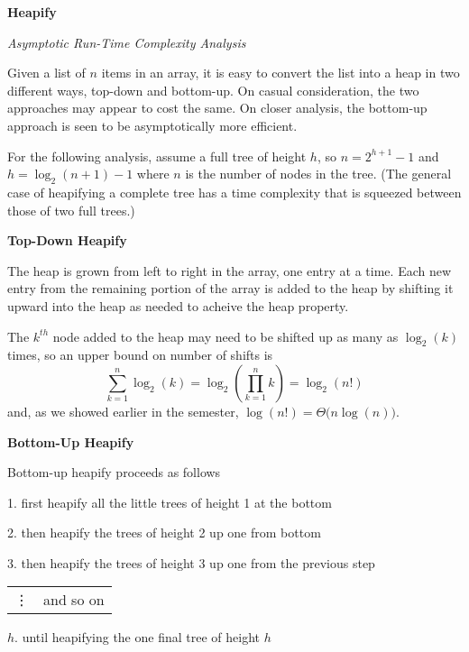 \documentclass{article}
\begin{document}
{\Large\bf Heapify}

{\large\it Asymptotic Run-Time Complexity Analysis}

\vspace{1pc}
Given a list of $n$ items in an array, it is easy to convert the list into a
heap in two different ways, top-down and bottom-up. On casual consideration,
the two approaches may appear to cost the same. On closer analysis, the
bottom-up approach is seen to be asymptotically more efficient.

\vspace{1pc}
For the following analysis,
assume a full tree of height $h$,
so $n=2^{h+1}-1$ and $h=\log_2(n+1) - 1$
where $n$ is the number of nodes in the tree.
(The general case of heapifying a complete tree has a time complexity that is
squeezed between those of two full trees.)

\vspace{1pc}
{\large\bf Top-Down Heapify}

\vspace{1pc}
The heap is grown from left to right in the array, one entry at a time.
Each new entry from the remaining portion of the array is added to the heap
by shifting it upward into the heap as needed to acheive the heap property.

\vspace{1pc}
The $k^{th}$ node added to the heap may need to be shifted up as many as
$\log_2(k)$ times, so an upper bound on number of shifts is
\[
  \sum_{k=1}^{n} \log_2(k)
=
  \log_2\!\!\left(\prod_{k=1}^{n} k\right)
=
  \log_2(n!)
\]
and, as we showed earlier in the semester, $\log(n!)=\Theta\big(n\log(n)\big)$.

\vspace{1pc}
{\large\bf Bottom-Up Heapify}

\vspace{1pc}
Bottom-up heapify proceeds as follows

\vspace{1pc}
1. first heapify all the little trees of height 1 at the bottom

2. then heapify the trees of height 2 up one from bottom

3. then heapify the trees of height 3 up one from the previous step

\begin{tabular}{ll}
\vdots & and so on \\
\end{tabular}

\vspace{0.5pc}
$h$. until heapifying the one final tree of height $h$
\end{document}
